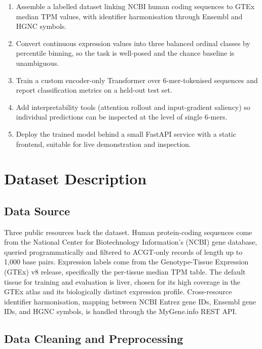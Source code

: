 \documentclass[11pt,a4paper]{article}
\begin{document}
\begin{enumerate}[itemsep=2pt]
    \item Assemble a labelled dataset linking NCBI human coding sequences to GTEx median TPM values, with identifier harmonisation through Ensembl and HGNC symbols.
    \item Convert continuous expression values into three balanced ordinal classes by percentile binning, so the task is well-posed and the chance baseline is unambiguous.
    \item Train a custom encoder-only Transformer over 6-mer-tokenised sequences and report classification metrics on a held-out test set.
    \item Add interpretability tools (attention rollout and input-gradient saliency) so individual predictions can be inspected at the level of single 6-mers.
    \item Deploy the trained model behind a small FastAPI service with a static frontend, suitable for live demonstration and inspection.
\end{enumerate}

\section{Dataset Description}

\subsection{Data Source}

Three public resources back the dataset. Human protein-coding sequences come from the National Center for Biotechnology Information's (NCBI) gene database, queried programmatically and filtered to ACGT-only records of length up to 1{,}000 base pairs. Expression labels come from the Genotype-Tissue Expression (GTEx) v8 release, specifically the per-tissue median TPM table. The default tissue for training and evaluation is liver, chosen for its high coverage in the GTEx atlas and its biologically distinct expression profile. Cross-resource identifier harmonisation, mapping between NCBI Entrez gene IDs, Ensembl gene IDs, and HGNC symbols, is handled through the MyGene.info REST API.

\subsection{Data Cleaning and Preprocessing}
\end{document}

